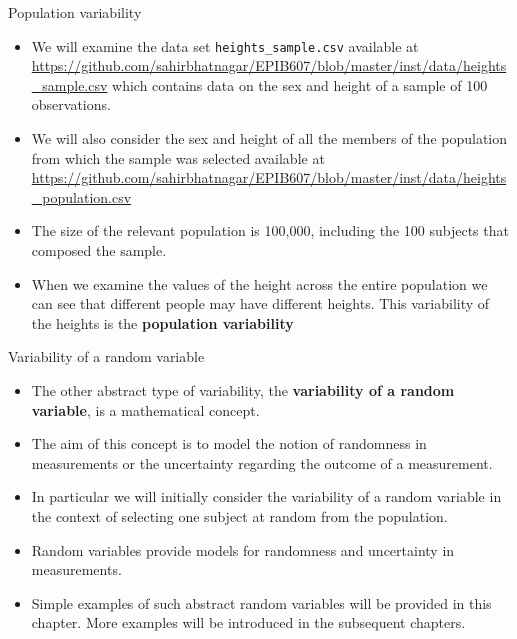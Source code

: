 \documentclass[10pt]{beamer}\usepackage[]{graphicx}\usepackage[]{color}
\begin{document}
\begin{frame}{Population variability}
	
	\begin{itemize}[<+->]
		
		\item  We will examine the data set \texttt{heights\_sample.csv} available at \url{https://github.com/sahirbhatnagar/EPIB607/blob/master/inst/data/heights_sample.csv} which contains data on the sex and height of a sample of 100 observations. 
		\item We will also consider the sex and height of all the members of the population from which the sample was selected available at \url{https://github.com/sahirbhatnagar/EPIB607/blob/master/inst/data/heights_population.csv}
		\item The size of the relevant population is 100,000, including the 100
		subjects that composed the sample. 
		\item When we examine the values of the
		height across the entire population we can see that different people may
		have different heights. This variability of the heights is the \textbf{population variability}
	\end{itemize}
	
\end{frame}


\begin{frame}{Variability of a random variable}
	
	\begin{itemize}[<+->]
		
		\item  The other abstract type of variability, the \textbf{variability of a random variable}, is a mathematical concept. 
		\item The aim of this concept is to model the notion of randomness in measurements or the uncertainty regarding
		the outcome of a measurement. 
		\item In particular we will initially consider the variability of a random variable in the context of selecting one
		subject at random from the population.
		\item Random variables provide models for randomness and uncertainty in measurements. 
		\item Simple examples of such abstract random variables will be provided in this
		chapter. More examples will be introduced in the subsequent chapters.
	\end{itemize}
	
\end{frame}
\end{document}
